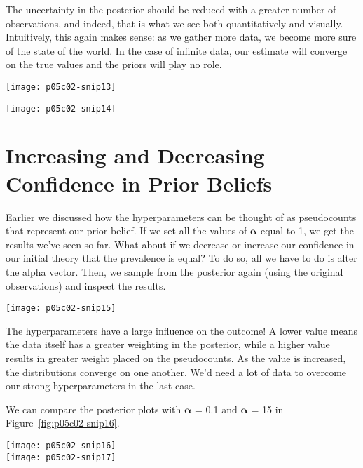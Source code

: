The uncertainty in the posterior should be reduced with a greater number of observations, and indeed, that is what we see both quantitatively and visually. Intuitively, this again makes sense: as we gather more data, we become more sure of the state of the world. In the case of infinite data, our estimate will converge on the true values and the priors will play no role.

\begin{figure*}[h]
    \texttt{[image: p05c02-snip13]}
\end{figure*}
\begin{figure*}[h]
    \texttt{[image: p05c02-snip14]}
    \caption{Posteriors with more data}
\end{figure*}


\section{Increasing and Decreasing Confidence in Prior Beliefs}

Earlier we discussed how the hyperparameters can be thought of as pseudocounts that represent our prior belief. If we set all the values of $\bm \alpha$ equal to 1, we get the results we've seen so far. What about if we decrease or increase our confidence in our initial theory that the prevalence is equal? To do so, all we have to do is alter the alpha vector. Then, we sample from the posterior again (using the original observations) and inspect the results.

\begin{figure*}[h]
    \texttt{[image: p05c02-snip15]}
\end{figure*}



The hyperparameters have a large influence on the outcome! A lower value means the data itself has a greater weighting in the posterior, while a higher value results in greater weight placed on the pseudocounts. As the value is increased, the distributions converge on one another. We'd need a lot of data to overcome our strong hyperparameters in the last case.

We can compare the posterior plots with $\bm \alpha$ = 0.1 and $\bm \alpha$ = 15 in Figure~\ref{fig:p05c02-snip16}.


\begin{figure*}[h]
    \texttt{[image: p05c02-snip16]}\\
    \texttt{[image: p05c02-snip17]}
    \caption{Posterior plots with different $\bm \alpha$ }
    \label{fig:p05c02-snip16}
\end{figure*}


